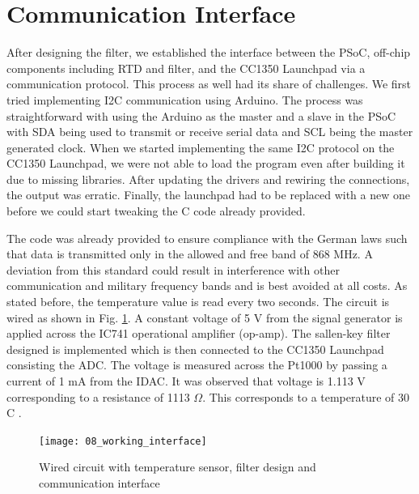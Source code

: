 \documentclass[conference]{IEEEtran}
\begin{document}
\section{Communication Interface}

After designing the filter, we established the interface between the PSoC, off-chip components including RTD and filter, and the CC1350 Launchpad via a communication protocol. This process as well had its share of challenges. We first tried implementing I2C communication using Arduino. The process was straightforward with using the Arduino as the master and a slave in the PSoC with SDA being used to transmit or receive serial data and SCL being the master generated clock. When we started implementing the same I2C protocol on the CC1350 Launchpad, we were not able to load the program even after building it due to missing libraries. After updating the drivers and rewiring the connections, the output was erratic. Finally, the launchpad had to be replaced with a new one before we could start tweaking the C code already provided.

The code was already provided to ensure compliance with the German laws such that data is transmitted only in the allowed and free band of 868 MHz. A deviation from this standard could result in interference with other communication and military frequency bands and is best avoided at all costs. As stated before, the temperature value is read every two seconds. The circuit is wired as shown in Fig. \ref{fig:comm}. A constant voltage of 5 V from the signal generator is applied across the IC741 operational amplifier (op-amp). The sallen-key filter designed is implemented which is then connected to the CC1350 Launchpad consisting the ADC. The voltage is measured across the Pt1000 by passing a current of 1 mA from the IDAC. It was observed that voltage is 1.113 V corresponding to a resistance of 1113 $\Omega$. This corresponds to a temperature of $30$\textdegree C \cite{b4}.

\begin{figure}[htbp]
	\centerline{\texttt{[image: 08\_working\_interface]}}
	\caption{Wired circuit with temperature sensor, filter design and communication interface}
	\label{fig:comm}
\end{figure}
\end{document}
